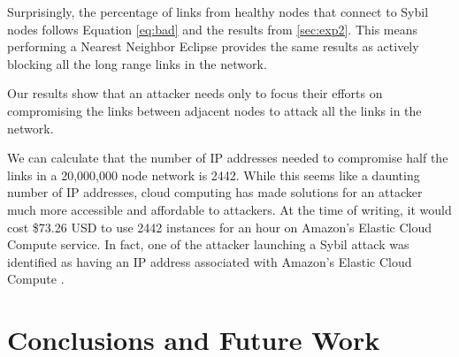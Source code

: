 \documentclass[11pt,conference]{IEEEtran}
\begin{document}
Surprisingly, the percentage of links from healthy nodes that connect to Sybil nodes follows Equation \ref{eq:bad} and the results from \ref{sec:exp2}.
This means performing a Nearest Neighbor Eclipse provides the same results as actively blocking all the long range links in the network.

Our results show that an attacker needs only to focus their efforts on compromising the links between adjacent nodes to attack all the links in the network.


We can calculate that the number of IP addresses needed to compromise half the links in a 20,000,000 node network is 2442.
While this seems like a daunting number of IP addresses, cloud computing has made solutions for an attacker much more accessible and affordable to attackers.
At the time of writing, it would cost \$73.26 USD to use 2442 instances for an hour on Amazon's Elastic Cloud Compute service.
In fact, one of the attacker launching a Sybil attack was identified as having an IP address associated with Amazon's Elastic Cloud Compute \cite{sybilbit}.








\section{Conclusions and Future Work}
\label{sec:horror}
\end{document}
